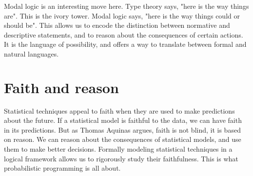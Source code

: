 \documentclass[sigplan,nonacm]{acmart}\settopmatter{printfolios=false,printccs=false,printacmref=false}
\begin{document}
  Modal logic is an interesting move here. Type theory says, "here is the way things are". This is the ivory tower. Modal logic says, "here is the way things could or should be". This allows us to encode the distinction between normative and descriptive statements, and to reason about the consequences of certain actions. It is the language of possibility, and offers a way to translate between formal and natural languages.

  \section{Faith and reason}

  Statistical techniques appeal to faith when they are used to make predictions about the future. If a statistical model is faithful to the data, we can have faith in its predictions. But as Thomas Aquinas argues, faith is not blind, it is based on reason. We can reason about the consequences of statistical models, and use them to make better decisions. Formally modeling statistical techniques in a logical framework allows us to rigorously study their faithfulness. This is what probabilistic programming is all about.

  
\end{document}
